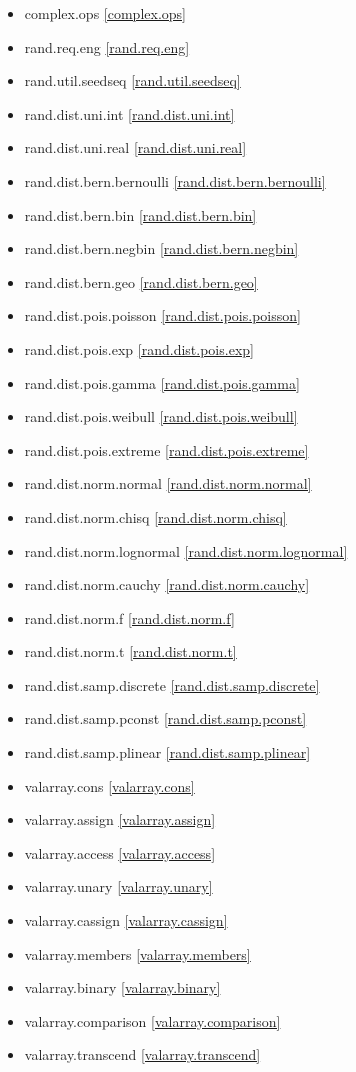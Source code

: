 \begin{multicols}{3}
\begin{itemize}
\item{complex.ops}				\ref{complex.ops}
\item{rand.req.eng}				\ref{rand.req.eng}
\item{rand.util.seedseq}		\ref{rand.util.seedseq}
\item{rand.dist.uni.int}		\ref{rand.dist.uni.int}
\item{rand.dist.uni.real}		\ref{rand.dist.uni.real}
\item{rand.dist.bern.bernoulli}	\ref{rand.dist.bern.bernoulli}
\item{rand.dist.bern.bin}		\ref{rand.dist.bern.bin}
\item{rand.dist.bern.negbin}	\ref{rand.dist.bern.negbin}
\item{rand.dist.bern.geo}		\ref{rand.dist.bern.geo}
\item{rand.dist.pois.poisson}	\ref{rand.dist.pois.poisson}
\item{rand.dist.pois.exp}		\ref{rand.dist.pois.exp}
\item{rand.dist.pois.gamma}		\ref{rand.dist.pois.gamma}
\item{rand.dist.pois.weibull}	\ref{rand.dist.pois.weibull}
\item{rand.dist.pois.extreme}	\ref{rand.dist.pois.extreme}
\item{rand.dist.norm.normal}	\ref{rand.dist.norm.normal}
\item{rand.dist.norm.chisq}		\ref{rand.dist.norm.chisq}
\item{rand.dist.norm.lognormal}	\ref{rand.dist.norm.lognormal}
\item{rand.dist.norm.cauchy}	\ref{rand.dist.norm.cauchy}
\item{rand.dist.norm.f}			\ref{rand.dist.norm.f}
\item{rand.dist.norm.t}			\ref{rand.dist.norm.t}
\item{rand.dist.samp.discrete}	\ref{rand.dist.samp.discrete}
\item{rand.dist.samp.pconst}	\ref{rand.dist.samp.pconst}
\item{rand.dist.samp.plinear}	\ref{rand.dist.samp.plinear}
\item{valarray.cons}			\ref{valarray.cons}
\item{valarray.assign}			\ref{valarray.assign}
\item{valarray.access}			\ref{valarray.access}
\item{valarray.unary}			\ref{valarray.unary}
\item{valarray.cassign}			\ref{valarray.cassign}
\item{valarray.members}			\ref{valarray.members}
\item{valarray.binary}			\ref{valarray.binary}
\item{valarray.comparison}		\ref{valarray.comparison}
\item{valarray.transcend}		\ref{valarray.transcend}
\end{itemize}
\end{multicols}

